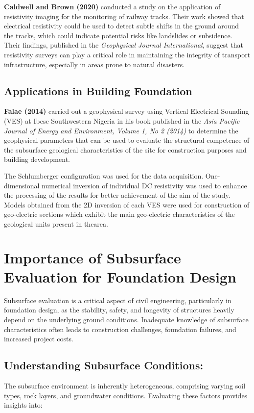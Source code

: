\documentclass[12pt,a4paper]{report}
\begin{document}
\textbf{Caldwell and Brown (2020)} conducted a study on the application of resistivity imaging for the monitoring of railway tracks. Their work showed that electrical resistivity could be used to detect subtle shifts in the ground around the tracks, which could indicate potential risks like landslides or subsidence. Their findings, published in the \textit{Geophysical Journal International}, suggest that resistivity surveys can play a critical role in maintaining the integrity of transport infrastructure, especially in areas prone to natural disasters.

\subsection{Applications in Building Foundation}
\textbf{Falae (2014)} carried out a geophysical survey using Vertical Electrical Sounding (VES) at Ibese Southwestern Nigeria in his book published in the \textit{Asia Pacific Journal of Energy and Environment, Volume 1, No 2 (2014)} to determine the geophysical parameters that can be used to evaluate the structural competence of the subsurface geological characteristics of the site for construction purposes and building development.

The Schlumberger configuration was used for the data acquisition. One-dimensional numerical inversion of individual DC resistivity was used to enhance the processing of the results for better achievement of the aim of the study. Models obtained from the 2D inversion of each VES were used for construction of geo-electric sections which exhibit the main geo-electric characteristics of the geological units present in thearea. 

\section{Importance of Subsurface Evaluation for Foundation Design}

Subsurface evaluation is a critical aspect of civil engineering, particularly in foundation design, as the stability, safety, and longevity of structures heavily depend on the underlying ground conditions. Inadequate knowledge of subsurface characteristics often leads to construction challenges, foundation failures, and increased project costs.

\subsection{Understanding Subsurface Conditions:}
The subsurface environment is inherently heterogeneous, comprising varying soil types, rock layers, and groundwater conditions. Evaluating these factors provides insights into:
\end{document}
